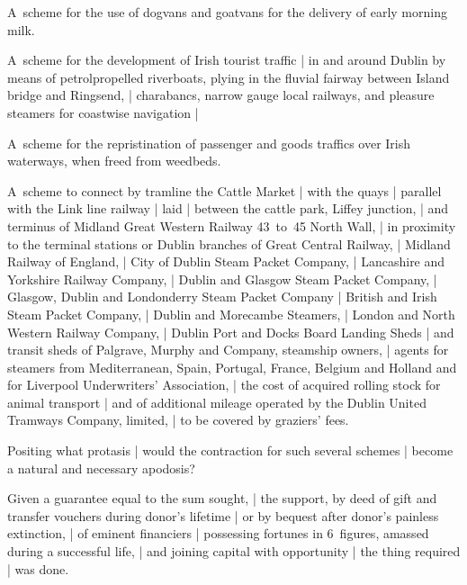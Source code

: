 \Household
A~scheme for the use of dogvans and goatvans
for the delivery of early morning milk.

\Factual
A~scheme for the development of Irish tourist traffic |
in and around Dublin by means of petrolpropelled riverboats,
plying in the fluvial fairway between Island bridge and Ringsend, |
charabancs, narrow gauge local railways,
and pleasure steamers for coastwise navigation |

\Philosophy
A~scheme for the repristination of passenger and goods traffics
over Irish waterways,
when freed from weedbeds.

\Places
A~scheme to connect by tramline the Cattle Market
 |
with the quays
 |
parallel with the Link line railway |
laid
 |
between the cattle park, Liffey junction, |
and terminus of Midland Great Western Railway
43~to~45 North Wall, |
in proximity to the terminal stations or Dublin branches
of Great Central Railway, |
Midland Railway of England, |
City of Dublin Steam Packet Company, |
Lancashire and Yorkshire Railway Company, |
Dublin and Glasgow Steam Packet Company, |
Glasgow, Dublin and Londonderry Steam Packet Company
 |
British and Irish Steam Packet Company, |
Dublin and Morecambe Steamers, |
London and North Western Railway Company, |
Dublin Port and Docks Board Landing Sheds |
and transit sheds of Palgrave, Murphy and Company, steamship owners, |
agents for steamers from Mediterranean, Spain, Portugal, France, Belgium and Holland
and for Liverpool Underwriters' Association, |
the cost of acquired rolling stock for animal transport |
and of additional mileage operated by the Dublin United Tramways Company, limited, |
to be covered by graziers' fees.


Positing what protasis |
would the contraction for such several schemes |
become a natural and necessary apodosis?

\Factual[~(legal)]
Given a guarantee equal to the sum sought, |
the support,
by deed of gift and transfer vouchers during donor's lifetime |
or by bequest after donor's painless extinction, |
of eminent financiers
 |
possessing fortunes in 6~figures,
amassed during a successful life, |
and joining capital with opportunity |
the thing required |
was done.


